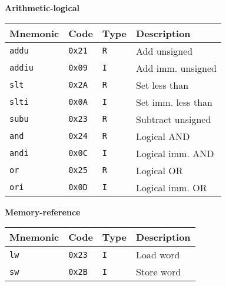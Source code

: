 \documentclass[11pt,twoside,a4paper]{article}
\begin{document}
\begin{figure}[H]
        \begin{multicols}{2}
        \center

        \textbf{Arithmetic-logical} \\
        \vspace{0.15in}
        \begin{tabular}{|l|l|l|l|}
                \hline
                \scriptsize {\bf Mnemonic} &
                \scriptsize {\bf Code} &
                \scriptsize {\bf Type} &
                \scriptsize {\bf Description} \\
                \hline {\tt addu} & {\tt 0x21} & {\tt R} & \scriptsize Add unsigned \\
                \hline {\tt addiu} & {\tt 0x09} & {\tt I} & \scriptsize Add imm. unsigned \\
                \hline {\tt slt} & {\tt 0x2A} & {\tt R} & \scriptsize Set less than \\
                \hline {\tt slti} & {\tt 0x0A} & {\tt I} & \scriptsize Set imm. less than \\
                \hline {\tt subu} & {\tt 0x23} & {\tt R} & \scriptsize Subtract unsigned \\
                \hline {\tt and} & {\tt 0x24} & {\tt R} & \scriptsize Logical AND \\
                \hline {\tt andi} & {\tt 0x0C} & {\tt I} & \scriptsize Logical imm. AND \\
                \hline {\tt or} & {\tt 0x25} & {\tt R} & \scriptsize Logical OR \\
                \hline {\tt ori} & {\tt 0x0D} & {\tt I} & \scriptsize Logical imm. OR \\
                \hline
        \end{tabular}
        
        \columnbreak
        \center

        \textbf{Memory-reference} \\
        \vspace{0.15in}
        \begin{tabular}{|l|l|l|l|}
                \hline
                \scriptsize {\bf Mnemonic} &
                \scriptsize {\bf Code} &
                \scriptsize {\bf Type} &
                \scriptsize {\bf Description} \\
                \hline {\tt lw} & {\tt 0x23} & {\tt I} & \scriptsize Load word \\
                \hline {\tt sw} & {\tt 0x2B} & {\tt I} & \scriptsize Store word \\
                \hline
        \end{tabular}


\end{multicols}
\end{figure}
\end{document}
